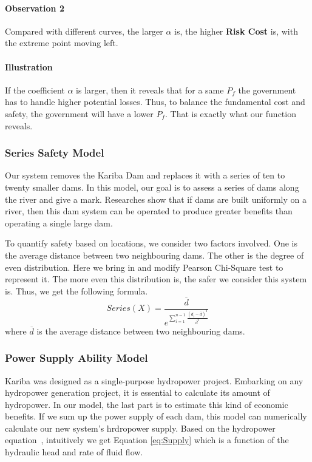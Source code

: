 \documentclass{mcmthesis}
\begin{document}
\paragraph{Observation 2}
Compared with different curves, the larger $\alpha$ is, the higher \textbf{Risk Cost} is, with the extreme point moving left.
\paragraph{Illustration}
If the coefficient $\alpha$ is larger, then it reveals that for a same $P_f$ the government has to handle higher potential losses. Thus, to balance the fundamental cost and safety, the government will have a lower $P_f$. That is exactly what our function reveals.
\subsubsection{Series Safety Model}
Our system removes the Kariba Dam and replaces it with a series of ten to twenty smaller dams. In this model, our goal is to assess a series of dams along the river and give a mark. Researches show that if dams are built uniformly on a river, then this dam system can be operated to produce greater benefits than operating a single large dam.

To quantify safety based on locations, we consider two factors involved. One is the average distance between two neighbouring dams. The other is the degree of even distribution. Here we bring in and modify Pearson Chi-Square test to represent it. The more even this distribution is, the safer we consider this system is. Thus, we get the following formula.
\begin{equation}
\label{eq:T}
Series(X) = \frac{\overline{d}}{e^{\sum_{i=1}^{n-1}\frac{(d_i-\overline{d})^2}{\overline{d}^2}}}
\end{equation}
where $\overline{d}$ is the average distance between two neighbouring dams.
\subsubsection{Power Supply Ability Model}
Kariba was designed as a single-purpose hydropower project. Embarking on any hydropower generation project, it is essential to calculate its amount of hydropower. In our model, the last part is to estimate this kind of economic benefits. If we sum up the power supply of each dam, this model can numerically calculate our new system's hrdropower supply. Based on the hydropower equation~\cite{Wiki_Hydro}, intuitively we get Equation \eqref{eq:Supply} which is a function of the hydraulic head and rate of fluid flow.
\end{document}
